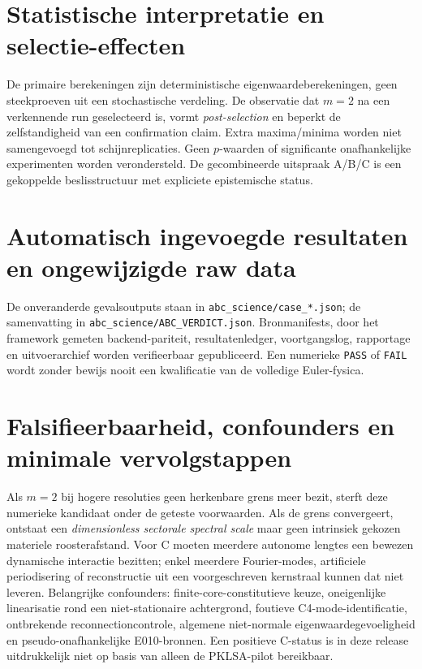 \documentclass[11pt,a4paper]{article}
\begin{document}
\section{Statistische interpretatie en selectie-effecten}
De primaire berekeningen zijn deterministische eigenwaardeberekeningen, geen steekproeven uit een stochastische verdeling. De observatie dat $m=2$ na een verkennende run geselecteerd is, vormt \emph{post-selection} en beperkt de zelfstandigheid van een confirmation claim. Extra maxima/minima worden niet samengevoegd tot schijnreplicaties. Geen $p$-waarden of significante onafhankelijke experimenten worden verondersteld. De gecombineerde uitspraak A/B/C is een gekoppelde beslisstructuur met expliciete epistemische status.

\section{Automatisch ingevoegde resultaten en ongewijzigde raw data}
De onveranderde gevalsoutputs staan in \texttt{abc\_science/case\_*.json}; de samenvatting in \texttt{abc\_science/ABC\_VERDICT.json}. Bronmanifests, door het framework gemeten backend-pariteit, resultatenledger, voortgangslog, rapportage en uitvoerarchief worden verifieerbaar gepubliceerd. Een numerieke \texttt{PASS} of \texttt{FAIL} wordt zonder bewijs nooit een kwalificatie van de volledige Euler-fysica.

\section{Falsifieerbaarheid, confounders en minimale vervolgstappen}
Als $m=2$ bij hogere resoluties geen herkenbare grens meer bezit, sterft deze numerieke kandidaat onder de geteste voorwaarden. Als de grens convergeert, ontstaat een \emph{dimensionless sectorale spectral scale} maar geen intrinsiek gekozen materiele roosterafstand. Voor C moeten meerdere autonome lengtes een bewezen dynamische interactie bezitten; enkel meerdere Fourier-modes, artificiele periodisering of reconstructie uit een voorgeschreven kernstraal kunnen dat niet leveren.
Belangrijke confounders: finite-core-constitutieve keuze, oneigenlijke linearisatie rond een niet-stationaire achtergrond, foutieve C4-mode-identificatie, ontbrekende reconnectioncontrole, algemene niet-normale eigenwaardegevoeligheid en pseudo-onafhankelijke E010-bronnen. Een positieve C-status is in deze release uitdrukkelijk niet op basis van alleen de PKLSA-pilot bereikbaar.
\end{document}
